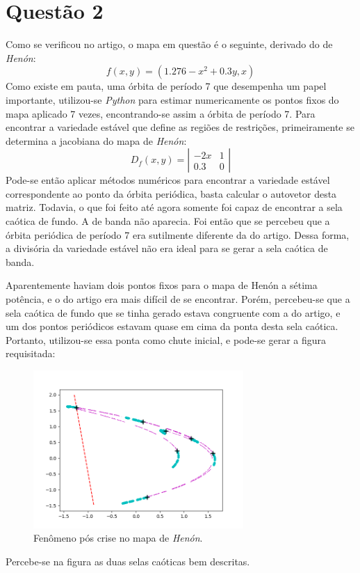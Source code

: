 \documentclass{article}[twocolumn]
\begin{document}
	\section{Quest\~ao 2}
	Como se verificou no artigo, o mapa em quest\~ao \'e o seguinte, derivado
	do de \textit{Hen\'on}:
	\begin{equation}
		f(x, y) = (1.276 - x^2 + 0.3y, x)
		\nonumber
	\end{equation}
	Como existe em pauta, uma \'orbita de per\'iodo 7 que desempenha um papel importante,
	utilizou-se \textit{Python} para estimar numericamente os pontos fixos do mapa aplicado
	7 vezes, encontrando-se assim a \'orbita de per\'iodo 7. Para encontrar a variedade
	est\'avel que define as regi\~oes de restri\c{c}\~oes, primeiramente se determina
	a jacobiana do mapa de \textit{Hen\'on}:
	\begin{equation}
		D_f(x, y) = \left|\begin{array}{cc}
			-2x & 1\\
			0.3 & 0
		\end{array}\right|
		\nonumber
	\end{equation}
	Pode-se ent\~ao aplicar m\'etodos num\'ericos para encontrar a variedade est\'avel
	correspondente ao ponto da \'orbita peri\'odica, basta calcular o autovetor desta matriz.
	Todavia, o que foi feito at\'e agora somente foi capaz de encontrar a sela ca\'otica de fundo.
	A de banda n\~ao aparecia. Foi ent\~ao que se percebeu que a \'orbita peri\'odica de per\'iodo
	7 era sutilmente diferente da do artigo. Dessa forma, a divis\'oria da variedade est\'avel
	n\~ao era ideal para se gerar a sela ca\'otica de banda.

	Aparentemente haviam dois pontos fixos para o mapa de Hen\'on a s\'etima pot\^encia,
	e o do artigo era mais dif\'icil de se encontrar. Por\'em, percebeu-se que a sela ca\'otica
	de fundo que se tinha gerado estava congruente com a do artigo, e um dos pontos peri\'odicos
	estavam quase em cima da ponta desta sela ca\'otica. Portanto, utilizou-se essa ponta
	como chute inicial, e pode-se gerar a figura requisitada:
	\begin{figure}[H]
		\centering
		\includegraphics[width=8cm]{szabo/szabo.png}
		\caption{Fen\^omeno p\'os crise no mapa de \textit{Hen\'on}.}
	\end{figure}
	Percebe-se na figura as duas selas ca\'oticas bem descritas.
\end{document}

